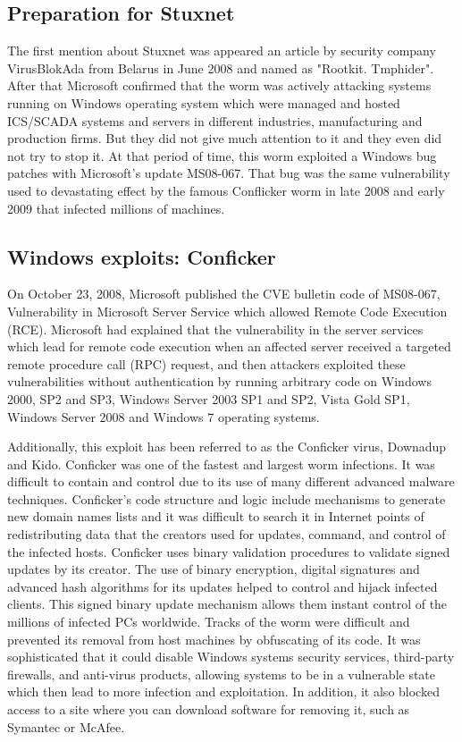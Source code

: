 \documentclass[conference]{IEEEtran}
\begin{document}
\subsection{Preparation for Stuxnet}
The first mention about Stuxnet was appeared an article by security company VirusBlokAda from Belarus in June 2008 and named as "Rootkit. Tmphider". After that Microsoft confirmed that the worm was actively attacking systems running on Windows operating system which were managed and hosted ICS/SCADA systems and servers in different industries, manufacturing and production firms. But they did not give much attention to it and they even did not try to stop it. At that period of time, this worm exploited a Windows bug patches with Microsoft's update MS08-067. That bug was the same vulnerability used to devastating effect by the famous Conflicker worm in late 2008 and early 2009 that infected millions of machines.
\subsection{Windows exploits: Conficker}
On October 23, 2008, Microsoft published the CVE bulletin code of MS08-067, Vulnerability in Microsoft Server Service which allowed Remote Code Execution (RCE). Microsoft had explained that the vulnerability in the server services which lead for remote code execution when an affected server received a targeted  remote procedure call (RPC) request, and then  attackers  exploited these vulnerabilities without authentication by running arbitrary code on Windows 2000, SP2 and SP3, Windows Server 2003 SP1 and SP2, Vista Gold SP1, Windows Server 2008 and Windows 7 operating systems. 

Additionally, this exploit has been referred to as the Conficker virus, Downadup and Kido. Conficker was one of the fastest and largest worm infections. It was difficult to contain and control due to its use of many different advanced malware techniques. Conficker's code structure and logic include mechanisms to generate new domain names lists and it was difficult to search it in Internet points of redistributing data that the creators used for updates, command, and control of the infected hosts. Conficker uses binary validation procedures to validate signed updates by its creator. The use of binary encryption, digital signatures and advanced hash algorithms for its updates helped to control and hijack infected clients. This signed binary update mechanism allows them instant control of the millions of infected PCs worldwide.  Tracks of the worm were difficult and prevented its removal from host machines by obfuscating of its code. It was sophisticated that it could disable Windows systems security services, third-party firewalls, and anti-virus products, allowing systems to be in a vulnerable state which then lead to more infection and exploitation. In addition, it also blocked access to a site where you can download software for removing it, such as Symantec or McAfee.
\end{document}
